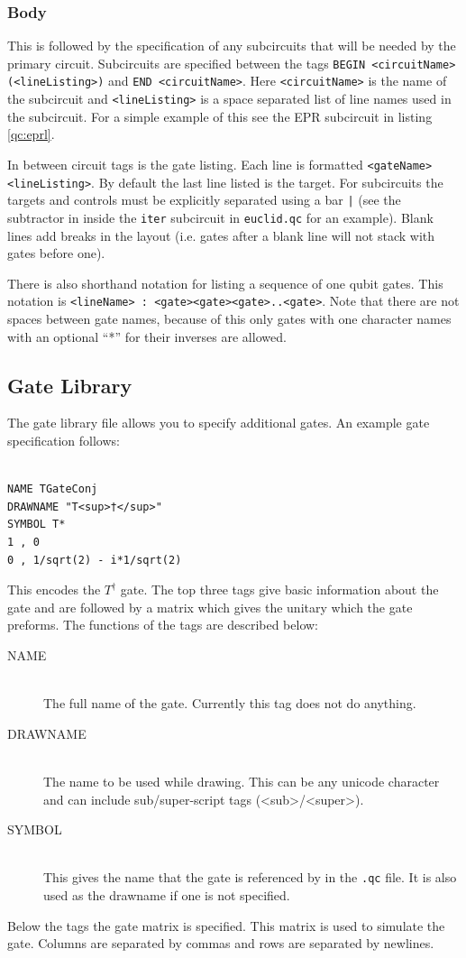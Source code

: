 \documentclass[10pt]{article}
\theoremstyle{definition}
\begin{document}
\subsubsection{Body}

This is followed by the specification of any subcircuits that will be needed by the primary circuit.
Subcircuits are specified between the tags \verb+BEGIN <circuitName> (<lineListing>)+ and
\verb+END <circuitName>+. Here \verb+<circuitName>+ is the name of the subcircuit 
and \verb+<lineListing>+ is a space separated list of line names
used in the subcircuit. For a simple example of this see the EPR subcircuit in listing \ref{qc:eprl}.

In between circuit tags is the gate listing.  
Each line is formatted \verb+<gateName> <lineListing>+.
By default the last line listed is the target.  
For subcircuits the targets and controls must be explicitly separated using a bar \verb+|+ (see the subtractor in inside the \verb+iter+ subcircuit in \verb+euclid.qc+ for an example).
Blank lines add breaks in the layout (i.e. gates after a blank line will not stack with gates before one).

There is also shorthand notation for listing a sequence of one qubit gates.
This notation is \verb+<lineName> : <gate><gate><gate>..<gate>+.
Note that there are not spaces between gate names, because of this only gates with one character names with an optional ``*'' for their inverses are allowed. 


\subsection{Gate Library}\label{sub:gateLib}
The gate library file allows you to specify additional gates.  An example gate specification follows:

\small
\begin{verbatim}

NAME TGateConj
DRAWNAME "T<sup>†</sup>"
SYMBOL T*
1 , 0
0 , 1/sqrt(2) - i*1/sqrt(2)

\end{verbatim}
\normalsize

This encodes the $T^\dagger$ gate. The top three tags give basic information about the gate and 
are followed by a matrix which gives the unitary which the gate preforms.  The functions of the 
tags are described below:
\begin{description}
\item[NAME] \hfill \\
The full name of the gate.  Currently this tag does not do anything.
\item[DRAWNAME] \hfill \\
The name to be used while drawing.  This can be any unicode character 
and can include sub/super-script tags (<sub>/<super>).
\item[SYMBOL] \hfill \\
This gives the name that the gate is referenced by in the \verb+.qc+ file.  It is also used as the drawname if one is not
specified.
\end{description}
Below the tags the gate matrix is specified.  This matrix is used to simulate the gate.  Columns are separated by commas
and rows are separated by newlines.
\end{document}

